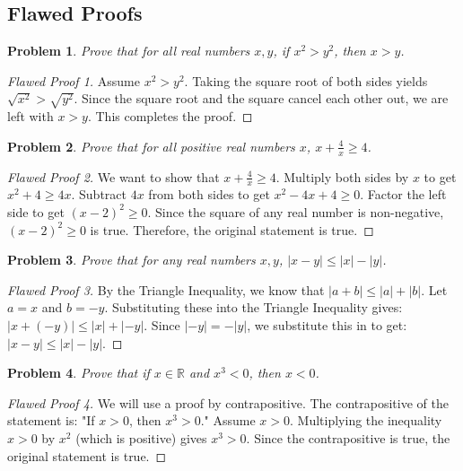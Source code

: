 \documentclass[11pt]{article}
\newtheorem{problem}{Problem}
\newcommand{\R}{\mathbb{R}}
\newcommand{\abs}[1]{\left|#1\right|}
\begin{document}
\subsection{Flawed Proofs}

\begin{problem}
Prove that for all real numbers $x, y$, if $x^2 > y^2$, then $x > y$.
\end{problem}
\begin{proof}[Flawed Proof 1]
Assume $x^2 > y^2$. Taking the square root of both sides yields $\sqrt{x^2} > \sqrt{y^2}$. Since the square root and the square cancel each other out, we are left with $x > y$. This completes the proof.
\end{proof}

\begin{problem}
Prove that for all positive real numbers $x$, $x + \frac{4}{x} \ge 4$.
\end{problem}
\begin{proof}[Flawed Proof 2]
We want to show that $x + \frac{4}{x} \ge 4$. 
Multiply both sides by $x$ to get $x^2 + 4 \ge 4x$.
Subtract $4x$ from both sides to get $x^2 - 4x + 4 \ge 0$.
Factor the left side to get $(x - 2)^2 \ge 0$.
Since the square of any real number is non-negative, $(x - 2)^2 \ge 0$ is true. Therefore, the original statement is true.
\end{proof}

\begin{problem}
Prove that for any real numbers $x, y$, $\abs{x - y} \le \abs{x} - \abs{y}$.
\end{problem}
\begin{proof}[Flawed Proof 3]
By the Triangle Inequality, we know that $\abs{a + b} \le \abs{a} + \abs{b}$. 
Let $a = x$ and $b = -y$. Substituting these into the Triangle Inequality gives:
$\abs{x + (-y)} \le \abs{x} + \abs{-y}$.
Since $\abs{-y} = -\abs{y}$, we substitute this in to get:
$\abs{x - y} \le \abs{x} - \abs{y}$.
\end{proof}

\begin{problem}
Prove that if $x \in \R$ and $x^3 < 0$, then $x < 0$.
\end{problem}
\begin{proof}[Flawed Proof 4]
We will use a proof by contrapositive. The contrapositive of the statement is: "If $x > 0$, then $x^3 > 0$."
Assume $x > 0$. Multiplying the inequality $x > 0$ by $x^2$ (which is positive) gives $x^3 > 0$. 
Since the contrapositive is true, the original statement is true.
\end{proof}
\end{document}
